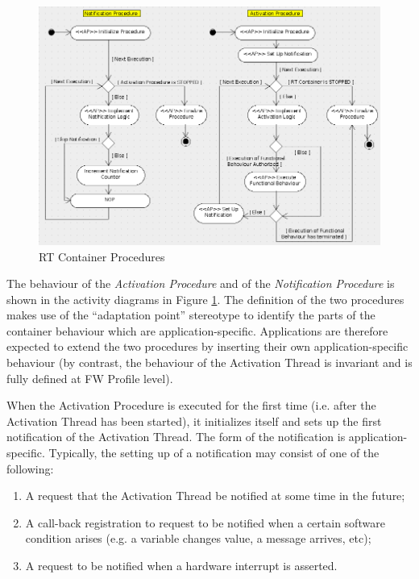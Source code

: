 \begin{figure}[ht]
 \centering
 \includegraphics[scale=0.39,keepaspectratio=true]{RTContainer.png}
 \caption{RT Container Procedures}
 \label{fig:RTContainerProcedures}
\end{figure}

The behaviour of the \emph{Activation Procedure} and of the \emph{Notification Procedure} is shown in the
activity diagrams in Figure \ref{fig:RTContainerProcedures}. The definition of the two procedures makes use of the
“adaptation point” stereotype to identify the parts of the container behaviour which are
application-specific. Applications are therefore expected to extend the two procedures by inserting
their own application-specific behaviour (by contrast, the behaviour of the Activation Thread is invariant and is fully defined at FW Profile level).

When the Activation Procedure is executed for the first time (i.e. after the Activation Thread
has been started), it initializes itself and sets up the first notification of the Activation Thread.
The form of the notification is application-specific. Typically, the setting up of a notification
may consist of one of the following:

\begin{enumerate} 
\item A request that the Activation Thread be notified at some time in the future;
\item A call-back registration to request to be notified when a certain software condition
arises (e.g. a variable changes value, a message arrives, etc);
\item A request to be notified when a hardware interrupt is asserted.
\end{enumerate}

